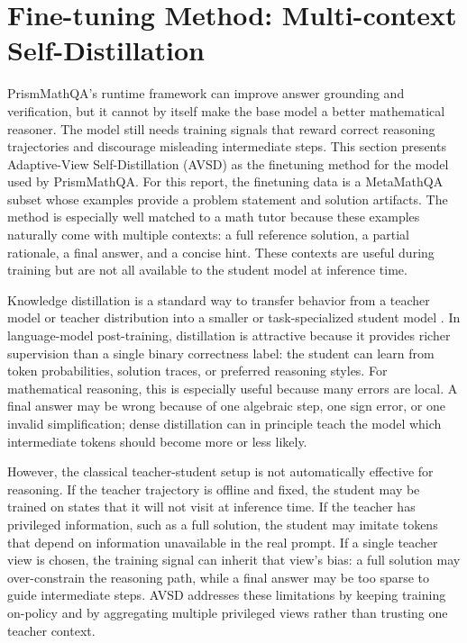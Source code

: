 \section{Fine-tuning Method: Multi-context Self-Distillation}
\label{sec:finetuning}

PrismMathQA's runtime framework can improve answer grounding and verification, but it cannot by itself make the base model a better mathematical reasoner. The model still needs training signals that reward correct reasoning trajectories and discourage misleading intermediate steps. This section presents Adaptive-View Self-Distillation (AVSD) \citep{nguyen2026avsd} as the finetuning method for the model used by PrismMathQA. For this report, the finetuning data is a MetaMathQA subset whose examples provide a problem statement and solution artifacts. The method is especially well matched to a math tutor because these examples naturally come with multiple contexts: a full reference solution, a partial rationale, a final answer, and a concise hint. These contexts are useful during training but are not all available to the student model at inference time.

Knowledge distillation is a standard way to transfer behavior from a teacher model or teacher distribution into a smaller or task-specialized student model \citep{hinton2015distilling}. In language-model post-training, distillation is attractive because it provides richer supervision than a single binary correctness label: the student can learn from token probabilities, solution traces, or preferred reasoning styles. For mathematical reasoning, this is especially useful because many errors are local. A final answer may be wrong because of one algebraic step, one sign error, or one invalid simplification; dense distillation can in principle teach the model which intermediate tokens should become more or less likely.

However, the classical teacher-student setup is not automatically effective for reasoning. If the teacher trajectory is offline and fixed, the student may be trained on states that it will not visit at inference time. If the teacher has privileged information, such as a full solution, the student may imitate tokens that depend on information unavailable in the real prompt. If a single teacher view is chosen, the training signal can inherit that view's bias: a full solution may over-constrain the reasoning path, while a final answer may be too sparse to guide intermediate steps. AVSD addresses these limitations by keeping training on-policy and by aggregating multiple privileged views rather than trusting one teacher context.

